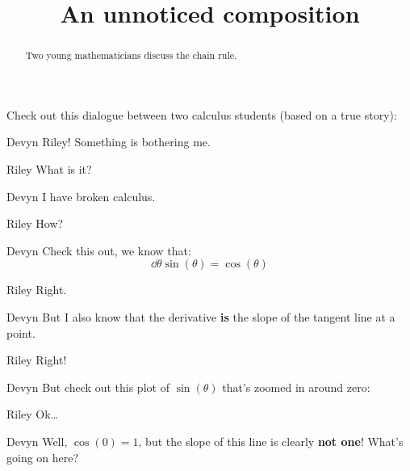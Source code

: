 \documentclass{ximera}
\title[Break-Ground:]{An unnoticed composition}
\begin{document}
\begin{abstract}
Two young mathematicians discuss the chain rule.
\end{abstract}
\maketitle

Check out this dialogue between two calculus students (based on a true
story):

\begin{dialogue}
\item[Devyn] Riley! Something is bothering me. 
\item[Riley] What is it?
\item[Devyn] I have broken calculus. 
\item[Riley] How?
\item[Devyn] Check this out, we know that:
  \[
  \dd{\theta} \sin(\theta) = \cos(\theta)
  \]
\item[Riley] Right. 
\item[Devyn] But I also know that the derivative \textbf{is} the slope
  of the tangent line at a point.
\item[Riley] Right!
\item[Devyn] But check out this plot of $\sin(\theta)$ that's zoomed in around zero:
  \begin{image}
  \end{image}
\item[Riley] Ok\dots
\item[Devyn] Well, $\cos(0) = 1$, but the slope of this line is
  clearly \textbf{not one}! What's going on here?
\end{dialogue}
\end{document}
